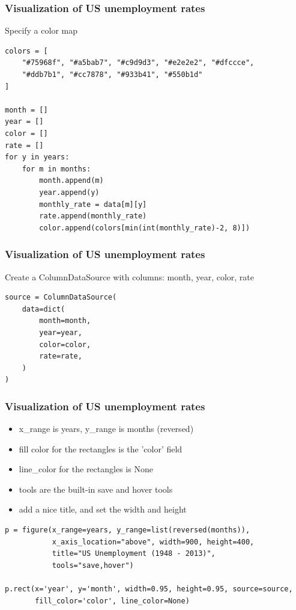 \begin{frame}[fragile] \frametitle{Visualization of US unemployment rates}
Specify a color map
\begin{lstlisting}
colors = [
    "#75968f", "#a5bab7", "#c9d9d3", "#e2e2e2", "#dfccce",
    "#ddb7b1", "#cc7878", "#933b41", "#550b1d"
]

month = []
year = []
color = []
rate = []
for y in years:
    for m in months:
        month.append(m)
        year.append(y)
        monthly_rate = data[m][y]
        rate.append(monthly_rate)
        color.append(colors[min(int(monthly_rate)-2, 8)])
\end{lstlisting}

\end{frame}

\begin{frame}[fragile] \frametitle{Visualization of US unemployment rates}
Create a ColumnDataSource with columns: month, year, color, rate
\begin{lstlisting}
source = ColumnDataSource(
    data=dict(
        month=month,
        year=year,
        color=color,
        rate=rate,
    )
)

\end{lstlisting}

\end{frame}

\begin{frame}[fragile] \frametitle{Visualization of US unemployment rates}
\begin{itemize}
\item x\_range is years, y\_range is months (reversed)
\item fill color for the rectangles is the 'color' field
\item line\_color for the rectangles is None
\item tools are the built-in save and hover tools
\item add a nice title, and set the width and height
\end{itemize}
\begin{lstlisting}
p = figure(x_range=years, y_range=list(reversed(months)),
           x_axis_location="above", width=900, height=400,
           title="US Unemployment (1948 - 2013)",
           tools="save,hover")

p.rect(x='year', y='month', width=0.95, height=0.95, source=source,
       fill_color='color', line_color=None)
\end{lstlisting}
\end{frame}

